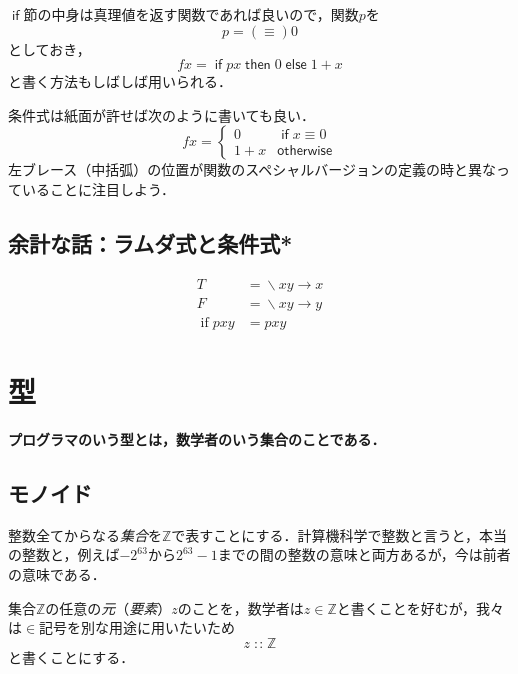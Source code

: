 \documentclass[twocolumn]{jsbook}
\newcommand{\keyword}[1]{{\emph{#1}}}
\newenvironment{leader}{\begingroup\bf}{\endgroup}
\newcommand{\mathKeyword}[1]{\mathsf{#1}}
\DeclareMathOperator{\mathElse}{\mathKeyword{else}}
\DeclareMathOperator{\mathIf}{\mathKeyword{if}}
\DeclareMathOperator{\mathIfFunc}{if}
\DeclareMathOperator{\mathIn}{:\!:}
\DeclareMathOperator{\mathLambda}{\backslash}
\DeclareMathOperator{\mathThen}{\mathKeyword{then}}
\newcommand{\mathLambdaArrow}{\rightarrow}
\newcommand{\mathOtherwise}{\mathKeyword{otherwise}}
\newcommand{\mathSpecialSet}[1]{\mathbb{#1}} %
\newcommand{\mathLambdaExpression}[2]{\mathLambda#1\mathLambdaArrow#2}
\begin{document}
$\mathIf$節の中身は真理値を返す関数であれば良いので，関数$p$を
\begin{equation}
p=(\equiv)0
\end{equation}
としておき，
\begin{equation}
fx=\mathIf px\mathThen0\mathElse1+x
\end{equation}
と書く方法もしばしば用いられる．

条件式は紙面が許せば次のように書いても良い．
\begin{equation}
fx=\begin{cases}
0&\mathIf x\equiv0\\
1+x&\mathOtherwise
\end{cases}
\end{equation}
左ブレース（中括弧）の位置が関数のスペシャルバージョンの定義の時と異なっていることに注目しよう．

\section{余計な話：ラムダ式と条件式*}

\begin{align}
T&=\mathLambdaExpression{xy}{x}\\
F&=\mathLambdaExpression{xy}{y}\\
\mathIfFunc pxy&=pxy
\end{align}


\chapter{型}

\begin{leader}
プログラマのいう型とは，数学者のいう集合のことである．
\end{leader}

\section{モノイド}

整数全てからなる\keyword{集合}を$\mathSpecialSet{Z}$で表すことにする．計算機科学で整数と言うと，本当の整数と，例えば$-2^{63}$から$2^{63}-1$までの間の整数の意味と両方あるが，今は前者の意味である．

集合$\mathSpecialSet{Z}$の任意の\keyword{元}（\keyword{要素}）$z$のことを，数学者は$z\in\mathSpecialSet{Z}$と書くことを好むが，我々は$\in$記号を別な用途に用いたいため
\begin{equation}
\label{eq:totality}
z\mathIn\mathSpecialSet{Z}
\end{equation}
と書くことにする．
\end{document}
